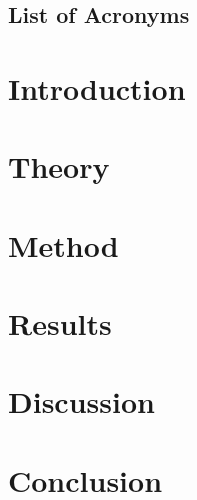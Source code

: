 \documentclass[a4paper,twoside,11pt]{report} %
\begin{document}

\pagecolor{white}
\pagestyle{empty}
\todototoc
\listoftodos
\cleardoublepage 

\clearpage 
\pagestyle{main}

\clearpage 

\clearpage 

\cleardoublepage 
\tableofcontents
\cleardoublepage 

\section*{List of Acronyms}


\cleardoublepage
\acresetall
\chapter{Introduction}

\cleardoublepage
\chapter{Theory}

\cleardoublepage
\chapter{Method}
\label{sec:method}

\cleardoublepage
\chapter{Results}
\label{sec:results}

\cleardoublepage
\chapter{Discussion}
\label{sec:discussion}

\cleardoublepage
\chapter{Conclusion}
\label{sec:conclusion}


\printbibliography[heading=bibintoc,title={Bibliography}]
\cleardoublepage 
\appendix

\cleartoleftpage

\end{document}
